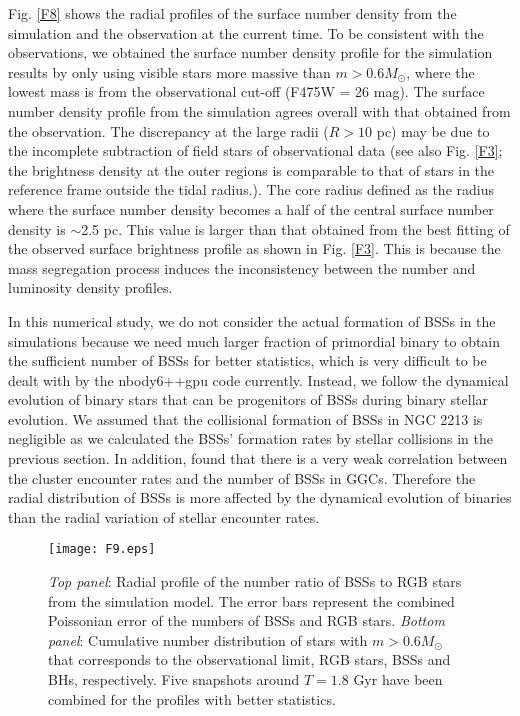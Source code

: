 \documentclass[useAMS,usenatbib,twocolumn]{mnras}
\begin{document}
Fig. \ref{F8} shows the radial profiles of the surface number density from the simulation and the observation at the current time. To be consistent with the observations, we obtained the surface number density profile for the simulation results by only using visible stars more massive than $m > 0.6M_{\odot}$, where the lowest mass is from the observational cut-off (F475W = 26 mag).  The surface number density profile from the simulation agrees overall with that obtained from the observation. The discrepancy at the large radii ($R > 10$ pc) may be due to the incomplete subtraction of field stars of observational data (see also Fig. \ref{F3}; the brightness density at the outer regions is comparable to that of stars in the reference frame outside the tidal radius.). The core radius defined as the radius where the surface number density becomes a half of the central surface number density is $\sim$2.5 pc. This value is larger than that obtained from the best fitting of the observed surface brightness profile as shown in Fig. \ref{F3}. This is because the mass segregation process induces the inconsistency between the number and luminosity density profiles. 

In this numerical study, we do not consider the actual formation of BSSs in the simulations because we need much larger fraction of primordial binary to obtain the sufficient number of BSSs for better statistics, which is very difficult to be dealt with by the {\sc nbody6++gpu} code currently. Instead, we follow the dynamical evolution of binary stars that can be progenitors of BSSs during binary stellar evolution. We assumed that the collisional formation of BSSs in NGC 2213 is negligible as we calculated the BSSs' formation rates by stellar collisions in the previous section. In addition, \citet{2013ApJ...777..106C} found that there is a very weak correlation between the cluster encounter rates and the number of BSSs in GGCs. Therefore the radial distribution of BSSs is more affected by the dynamical evolution of binaries than the radial variation of stellar encounter rates.

\begin{figure}
  \centering
  \texttt{[image: F9.eps]}
  \caption{{\it Top panel}: Radial profile of the number ratio of BSSs to RGB stars from the simulation model. The error bars represent the combined Poissonian error of the numbers of BSSs and RGB stars. {\it Bottom panel}: Cumulative number distribution of stars with $m > 0.6 M_{\odot}$ that corresponds to the observational limit, RGB stars, BSSs and BHs, respectively. Five snapshots around $T = 1.8$ Gyr have been combined for the profiles with better statistics.}\label{F9}
\end{figure}
\end{document}
